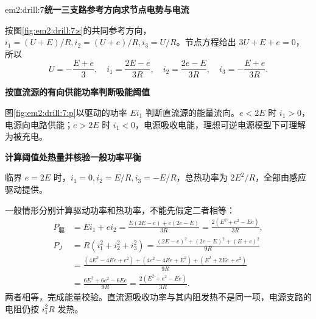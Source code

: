 \begin{drillsolution}{em2:drill:7}\textbf{统一三支路参考方向求节点电势与电流}\par\nobreak
按图\ref{fig:em2:drill:7:s}的共同参考方向，$i_1=(U+E)/R,i_2=(U+e)/R,i_3=U/R$。节点方程给出 $3U+E+e=0$，所以
\[U=-\frac{E+e}{3},\quad i_1=\frac{2E-e}{3R},\quad i_2=\frac{2e-E}{3R},\quad i_3=-\frac{E+e}{3R}.\]



\par\medskip{}\noindent\textbf{按直流源的有向供能功率判断吸能阈值}\par\nobreak
图\ref{fig:em2:drill:7:p}以驱动的功率 $Ei_1$ 判断直流源的能量流向。$e<2E$ 时 $i_1>0$，电源向电路供能；$e>2E$ 时 $i_1<0$，电源吸收电能，理想可逆电源模型下可理解为被充电。



\par\medskip{}\noindent\textbf{计算阈值处热量并核验一般功率平衡}\par\nobreak
临界 $e=2E$ 时，$i_1=0,i_2=E/R,i_3=-E/R$，总热功率为 $2E^2/R$，全部由感应驱动提供。

一般情形分别计算驱动功率和热功率，不能先假定二者相等：
\[
 \begin{aligned}
 P_{\text{驱}}&=Ei_1+ei_2
 =\frac{E(2E-e)+e(2e-E)}{3R}
 =\frac{2(E^2+e^2-Ee)}{3R},\\
 P_J&=R(i_1^2+i_2^2+i_3^2)
 =\frac{(2E-e)^2+(2e-E)^2+(E+e)^2}{9R}\\
 &=\frac{(4E^2-4Ee+e^2)+(4e^2-4Ee+E^2)+(E^2+2Ee+e^2)}{9R}\\
 &=\frac{6E^2+6e^2-6Ee}{9R}
 =\frac{2(E^2+e^2-Ee)}{3R}.
 \end{aligned}
\]
两者相等，完成能量校验。直流源吸收功率与其内阻发热不是同一项，电源支路的电阻仍按 $i_1^2R$ 发热。\end{drillsolution}
